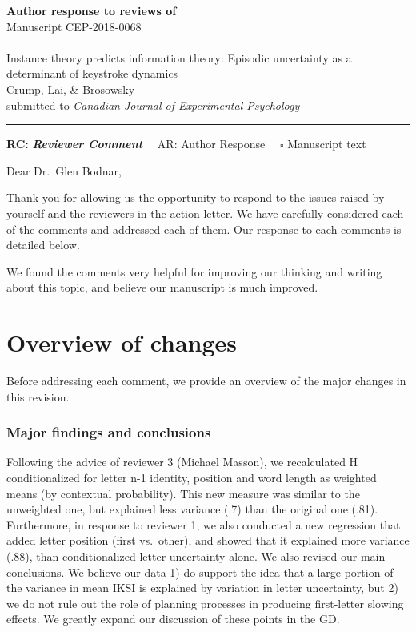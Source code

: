 \documentclass[draft]{article}
\begin{document}
{\Large\bf Author response to reviews of}\\[1em]
Manuscript CEP-2018-0068\\ \\
{\Large Instance theory predicts information theory: Episodic uncertainty as a determinant of keystroke dynamics}\\[1em]
{Crump, Lai, \& Brosowsky}\\
{submitted to \it Canadian Journal of Experimental Psychology }\\
\hrule

\hfill {\bfseries RC:} \textbf{\textit{Reviewer Comment}}\(\quad\) AR: Author Response \(\quad\square\) Manuscript text

\vspace{2em}

Dear Dr.~Glen Bodnar,

Thank you for allowing us the opportunity to respond to the issues raised by yourself and the reviewers in the action letter. We have carefully considered each of the comments and addressed each of them. Our response to each comments is detailed below.

We found the comments very helpful for improving our thinking and writing about this topic, and believe our manuscript is much improved.

\hypertarget{overview-of-changes}{%
\section{Overview of changes}\label{overview-of-changes}}

Before addressing each comment, we provide an overview of the major changes in this revision.

\hypertarget{major-findings-and-conclusions}{%
\subsubsection{Major findings and conclusions}\label{major-findings-and-conclusions}}

Following the advice of reviewer 3 (Michael Masson), we recalculated H conditionalized for letter n-1 identity, position and word length as weighted means (by contextual probability). This new measure was similar to the unweighted one, but explained less variance (.7) than the original one (.81). Furthermore, in response to reviewer 1, we also conducted a new regression that added letter position (first vs.~other), and showed that it explained more variance (.88), than conditionalized letter uncertainty alone. We also revised our main conclusions. We believe our data 1) do support the idea that a large portion of the variance in mean IKSI is explained by variation in letter uncertainty, but 2) we do not rule out the role of planning processes in producing first-letter slowing effects. We greatly expand our discussion of these points in the GD.
\end{document}
